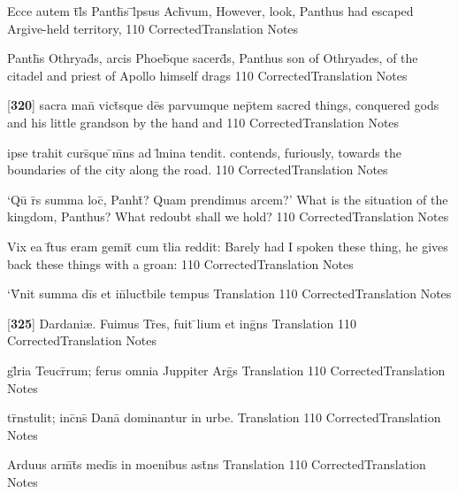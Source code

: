 \latline
  {Ecce autem t\={}l\={\macron {\i}}s Panth\={}s \={}l\={}psus Ach\={\macron {\i}}vum,}
  { However, look, Panthus had escaped Argive-held territory, }
  {110}
  { CorrectedTranslation }
  { Notes }


\latline
  {Panth\={}s Othryad\={}s, arcis Phoeb\={\macron {\i}}que sacerd\={}s,}
  { Panthus son of Othryades, of the citadel and priest of Apollo himself drags }
  {110}
  { CorrectedTranslation }
  { Notes }


\latline
  {[\textbf{320}] sacra man\={} vict\={}sque de\={}s parvumque nep\={}tem}
  { sacred things, conquered gods and his little grandson by the hand and  }
  {110}
  { CorrectedTranslation }
  { Notes }


\latline
  {ipse trahit curs\={}que \={}m\={}ns ad l\={\macron {\i}}mina tendit.}
  { contends, furiously, towards the boundaries of the city along the road. }
  {110}
  { CorrectedTranslation }
  { Notes }


\latline
  {`Qu\={} r\={}s summa loc\={}, Panht\={}?  Quam prendimus arcem?'}
  { What is the situation of the kingdom, Panthus?  What redoubt shall we hold? }
  {110}
  { CorrectedTranslation }
  { Notes }


\latline
  {Vix ea f\={}tus eram gemit\={} cum t\={}lia reddit:}
  { Barely had I spoken these thing, he gives back these things with a groan: }
  {110}
  { CorrectedTranslation }
  { Notes }


\latline
  {`V\={}nit summa di\={}s et in\={}luct\={}bile tempus}
  { Translation }
  {110}
  { CorrectedTranslation }
  { Notes }


\latline
  {[\textbf{325}] Dardani{\ae}.  Fuimus Tr\={}es, fuit \={}lium et ing\={}ns}
  { Translation }
  {110}
  { CorrectedTranslation }
  { Notes }


\latline
  {gl\={}ria Teucr\={}rum; ferus omnia Juppiter Arg\={}s}
  { Translation }
  {110}
  { CorrectedTranslation }
  { Notes }


\latline
  {tr\={}nstulit; inc\={}ns\={} Dana\={\macron {\i}} dominantur in urbe.}
  { Translation }
  {110}
  { CorrectedTranslation }
  { Notes }


\latline
  {Arduus arm\={}t\={}s medi\={\macron {\i}}s in moenibus ast\={}ns}
  { Translation }
  {110}
  { CorrectedTranslation }
  { Notes }


